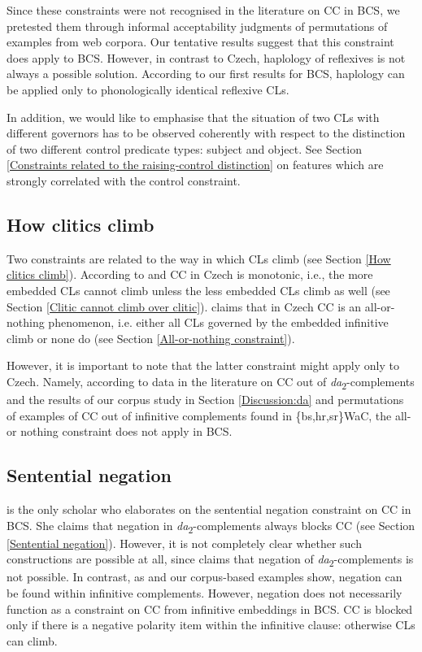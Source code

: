 Since these constraints were not recognised in the literature on CC in BCS, we pretested them through informal acceptability judgments of permutations of examples from web corpora. Our tentative results suggest that this constraint does apply to BCS. However, in contrast to Czech, haplology of reflexives is not always a possible solution. According to our first results for BCS, haplology can be applied only to phonologically identical reflexive CLs. 

In addition, we would like to emphasise that the situation of two CLs with different governors has to be observed coherently with respect to the distinction of two different control predicate types: subject and object. See Section \ref{Constraints related to the raising-control distinction} on features which are strongly correlated with the control constraint. 

\subsection{How clitics climb}

Two constraints are related to the way in which CLs climb (see Section \ref{How clitics climb}). According to \citet{Hana07} and \citet{Rosen14} CC in Czech is monotonic, i.e., the more embedded CLs cannot climb unless the less embedded CLs climb as well (see Section \ref{Clitic cannot climb over clitic}). \citet{Rezac05} claims that in Czech CC is an all-or-nothing phenomenon, i.e. either all CLs governed by the embedded infinitive climb or none do (see Section \ref{All-or-nothing constraint}). 

However, it is important to note that the latter constraint might apply only to Czech. Namely, according to data in the literature on CC out of \textit{da}\textsubscript{2}-complements \citep[e.g.][]{Stjepanovic04} and the results of our corpus study in Section \ref{Discussion:da} and permutations of examples of CC out of infinitive complements found in \{bs,hr,sr\}WaC, the all-or nothing constraint does not apply in BCS. 

\subsection{Sentential negation}

\citet{Aljovic04, Aljovic05} is the only scholar who elaborates on the sentential negation constraint on CC in BCS. She claims that negation in \textit{da}\textsubscript{2}-complements always blocks CC (see Section \ref{Sentential negation}). However, it is not completely clear whether such constructions are possible at all, since \citet{Todorovic12} claims that negation of \textit{da}\textsubscript{2}-complements is not possible. In contrast, as \citet{Aljovic05} and our corpus-based examples show, negation can be found within infinitive complements. However, negation does not necessarily function as a constraint on CC from infinitive embeddings in BCS. CC is blocked only if there is a negative polarity item within the infinitive clause: otherwise CLs can climb. 

